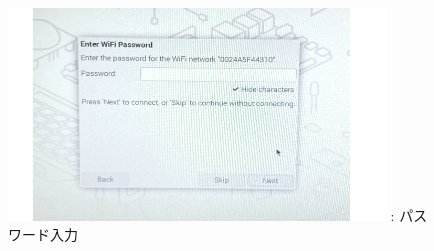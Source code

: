 \documentclass[a4paper,12pt]{jarticle}
\begin{document}
\begin{enumerate}
\begin{itemize}
                      \begin{figure}[h]
                        \centering
                        \begin{minipage}{5.228cm}
                          {\upshape
                            \includegraphics[width=10.000cm]{pswd_image_0404.png}
                            \newline
                            {\theFigure\label{seq:refFigure17}}:
                            パスワード入力}
                        \end{minipage}
                      \end{figure}
                      
                \end{itemize}  
   \clearpage

\end{enumerate}
\end{document}
